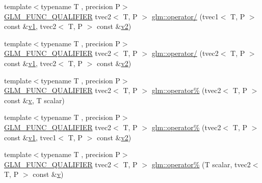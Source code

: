 \begin{DoxyCompactItemize}
\item 
{\footnotesize template$<$typename T , precision P$>$ }\\\mbox{\hyperlink{setup_8hpp_a33fdea6f91c5f834105f7415e2a64407}{G\+L\+M\+\_\+\+F\+U\+N\+C\+\_\+\+Q\+U\+A\+L\+I\+F\+I\+ER}} tvec2$<$ T, P $>$ \mbox{\hyperlink{namespaceglm_a1a24638497823c9f69b66226967a7673}{glm\+::operator/}} (tvec1$<$ T, P $>$ const \&\mbox{\hyperlink{glad_8h_a0779c3b73f9aa3a0ac5b0139b5d291d9}{v1}}, tvec2$<$ T, P $>$ const \&\mbox{\hyperlink{glad_8h_a9a09a1837922b2b806f4589096a52049}{v2}})
\item 
{\footnotesize template$<$typename T , precision P$>$ }\\\mbox{\hyperlink{setup_8hpp_a33fdea6f91c5f834105f7415e2a64407}{G\+L\+M\+\_\+\+F\+U\+N\+C\+\_\+\+Q\+U\+A\+L\+I\+F\+I\+ER}} tvec2$<$ T, P $>$ \mbox{\hyperlink{namespaceglm_ad249518ea6d98b33dd2e1463ad8c6f43}{glm\+::operator/}} (tvec2$<$ T, P $>$ const \&\mbox{\hyperlink{glad_8h_a0779c3b73f9aa3a0ac5b0139b5d291d9}{v1}}, tvec2$<$ T, P $>$ const \&\mbox{\hyperlink{glad_8h_a9a09a1837922b2b806f4589096a52049}{v2}})
\item 
{\footnotesize template$<$typename T , precision P$>$ }\\\mbox{\hyperlink{setup_8hpp_a33fdea6f91c5f834105f7415e2a64407}{G\+L\+M\+\_\+\+F\+U\+N\+C\+\_\+\+Q\+U\+A\+L\+I\+F\+I\+ER}} tvec2$<$ T, P $>$ \mbox{\hyperlink{namespaceglm_adb946535a105c4365862c1e5ed866004}{glm\+::operator\%}} (tvec2$<$ T, P $>$ const \&\mbox{\hyperlink{glad_8h_a14cfbe2fc2234f5504618905b69d1e06}{v}}, T scalar)
\item 
{\footnotesize template$<$typename T , precision P$>$ }\\\mbox{\hyperlink{setup_8hpp_a33fdea6f91c5f834105f7415e2a64407}{G\+L\+M\+\_\+\+F\+U\+N\+C\+\_\+\+Q\+U\+A\+L\+I\+F\+I\+ER}} tvec2$<$ T, P $>$ \mbox{\hyperlink{namespaceglm_ac70ea13b22949d496bc442530212331a}{glm\+::operator\%}} (tvec2$<$ T, P $>$ const \&\mbox{\hyperlink{glad_8h_a0779c3b73f9aa3a0ac5b0139b5d291d9}{v1}}, tvec1$<$ T, P $>$ const \&\mbox{\hyperlink{glad_8h_a9a09a1837922b2b806f4589096a52049}{v2}})
\item 
{\footnotesize template$<$typename T , precision P$>$ }\\\mbox{\hyperlink{setup_8hpp_a33fdea6f91c5f834105f7415e2a64407}{G\+L\+M\+\_\+\+F\+U\+N\+C\+\_\+\+Q\+U\+A\+L\+I\+F\+I\+ER}} tvec2$<$ T, P $>$ \mbox{\hyperlink{namespaceglm_aa7ea54310f3e948dc36248843aa05f45}{glm\+::operator\%}} (T scalar, tvec2$<$ T, P $>$ const \&\mbox{\hyperlink{glad_8h_a14cfbe2fc2234f5504618905b69d1e06}{v}})

\end{DoxyCompactItemize}
